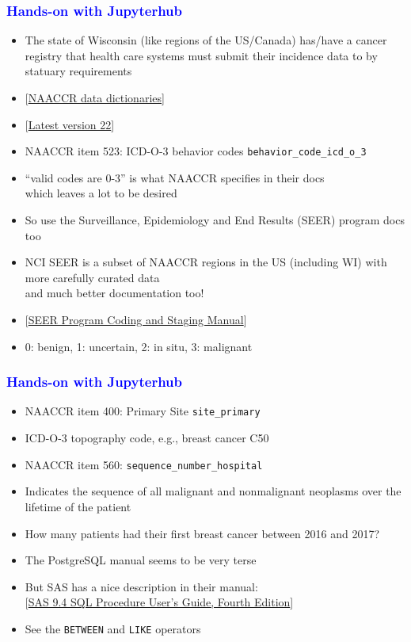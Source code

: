 \documentclass[11pt,pdftex,dvipsnames,usenames]{beamer}
\begin{document}
\begin{frame}[fragile]\frametitle{\bf\textcolor{blue}{Hands-on with Jupyterhub}}
\begin{itemize}
\item The state of Wisconsin (like regions of the US/Canada) 
has/have a cancer registry that health care systems must
submit their incidence data to by statuary requirements
\item \textcolor{PineGreen}{[\href{https://www.naaccr.org/data-standards-data-dictionary}
{NAACCR data dictionaries}]}
\item 
\textcolor{PineGreen}{[\href{http://datadictionary.naaccr.org/default.aspx?c=10&Version=22}
{Latest version 22}]}
\item NAACCR item 523: ICD-O-3 behavior codes \texttt{behavior\_code\_icd\_o\_3}
\item ``valid codes are 0-3'' is what NAACCR specifies in their docs\\ 
which leaves a lot to be desired
\item So use the Surveillance, Epidemiology
and End Results (SEER) program docs too 
\item NCI SEER is a subset of NAACCR
regions in the US (including WI) with more carefully curated data\\
and much better documentation too!
\item \textcolor{PineGreen}{[\href{https://seer.cancer.gov/manuals/2022/SPCSM_2022_MainDoc.pdf}
{SEER Program Coding and Staging Manual}]}
\item 0: benign, 1: uncertain, 2: in situ, 3: malignant
\end{itemize}
\end{frame}

\begin{frame}[fragile]\frametitle{\bf\textcolor{blue}{Hands-on with Jupyterhub}}
\begin{itemize}
\item NAACCR item 400: Primary Site \texttt{site\_primary}
\item ICD-O-3 topography code, e.g., breast cancer C50
\item NAACCR item 560: \texttt{sequence\_number\_hospital}
\item Indicates the sequence of all malignant and nonmalignant
neoplasms over the lifetime of the patient
\item How many patients had their first breast cancer between
2016 and 2017?
\item The PostgreSQL manual seems to be very terse
\item But SAS has a nice description in their manual: \\
\textcolor{PineGreen}{[\href{https://documentation.sas.com/doc/en/pgmsascdc/9.4_3.5/sqlproc/titlepage.htm}{SAS 9.4 SQL Procedure User’s Guide, Fourth Edition}]}
\item See the \texttt{BETWEEN} and \texttt{LIKE} operators
\end{itemize}
\end{frame}
\end{document}
